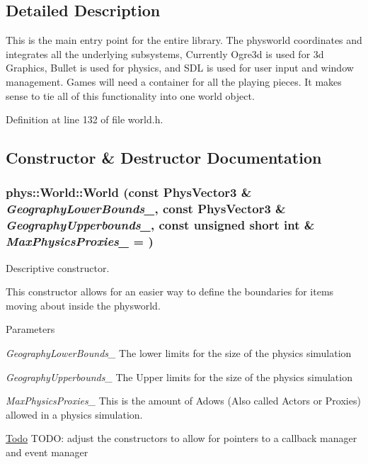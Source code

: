 \subsection{Detailed Description}
This is the main entry point for the entire library. The physworld coordinates and integrates all the underlying subsystems, Currently Ogre3d is used for 3d Graphics, Bullet is used for physics, and SDL is used for user input and window management. Games will need a container for all the playing pieces. It makes sense to tie all of this functionality into one world object. 

Definition at line 132 of file world.h.



\subsection{Constructor \& Destructor Documentation}
\hypertarget{classphys_1_1World_a1f020a5a49a3bbfca6d570db44e72beb}{
\subsubsection[{World}]{\setlength{\rightskip}{0pt plus 5cm}phys::World::World (const {\bf PhysVector3} \& {\em GeographyLowerBounds\_\-}, \/  const {\bf PhysVector3} \& {\em GeographyUpperbounds\_\-}, \/  const unsigned short int \& {\em MaxPhysicsProxies\_\-} = {})}}
\label{da/ddf/classphys_1_1World_a1f020a5a49a3bbfca6d570db44e72beb}


Descriptive constructor. 

This constructor allows for an easier way to define the boundaries for items moving about inside the physworld. 
\begin{DoxyParams}{Parameters}
\item[{\em GeographyLowerBounds\_\-}]The lower limits for the size of the physics simulation \item[{\em GeographyUpperbounds\_\-}]The Upper limits for the size of the physics simulation \item[{\em MaxPhysicsProxies\_\-}]This is the amount of Adows (Also called Actors or Proxies) allowed in a physics simulation.\end{DoxyParams}
\begin{Desc}
\item[\hyperlink{todo__todo000019}{Todo}]TODO: adjust the constructors to allow for pointers to a callback manager and event manager \end{Desc}


